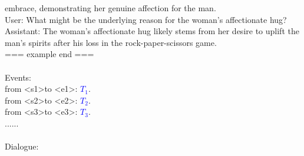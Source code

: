 \documentclass[10pt,twocolumn,letterpaper]{article}
\begin{document}
\begin{figure*}[t]
\begin{tcolorbox}[colback=gray!20, colframe=black, text width=0.9\textwidth, title={Box 4: Prompt for LLM in Stage 3, designed to transform a series of events into high-quality dialogue.}]
embrace, demonstrating her genuine affection for the man.\\User: What might be the underlying reason for the woman's affectionate hug?\\Assistant: The woman's affectionate hug likely stems from her desire to uplift the man's spirits after his loss in the rock-paper-scissors game.\\=== example end ===\\\\Events:\\ 
from \textless s1\textgreater  to \textless e1\textgreater : \textcolor{blue}{$T_1$}.\\
from \textless s2\textgreater  to \textless e2\textgreater : \textcolor{blue}{$T_2$}.\\
from \textless s3\textgreater  to \textless e3\textgreater : \textcolor{blue}{$T_3$}.\\
...... \\\\
Dialogue:

\end{tcolorbox}

\end{figure*}  
\end{document}
